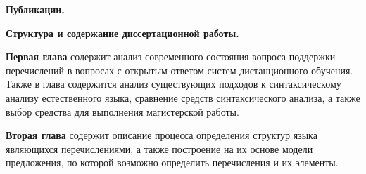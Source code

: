 \documentclass[a4paper]{G2-105}
\begin{document}
\par \textbf{Публикации.} %

\par \textbf{Структура и содержание диссертационной работы.} %
\par \textbf{Первая глава} содержит анализ современного состояния вопроса поддержки перечислений в вопросах с открытым ответом систем дистанционного обучения. Также в глава содержится анализ существующих подходов к синтаксическому анализу естественного языка, сравнение средств синтаксического анализа, а также выбор средства для выполнения магистерской работы.
\par \textbf{Вторая глава} содержит описание процесса определения структур языка являющихся перечислениями, а также построение на их основе модели предложения, по которой возможно определить перечисления и их элементы.
\end{document}
